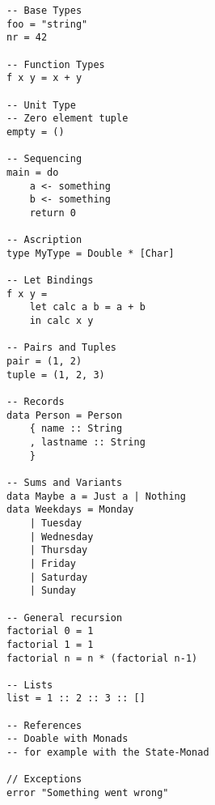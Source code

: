 \begin{verbatim}
-- Base Types
foo = "string"
nr = 42

-- Function Types
f x y = x + y

-- Unit Type
-- Zero element tuple
empty = ()

-- Sequencing
main = do
    a <- something
    b <- something
    return 0

-- Ascription
type MyType = Double * [Char]

-- Let Bindings
f x y =
    let calc a b = a + b
    in calc x y

-- Pairs and Tuples
pair = (1, 2)
tuple = (1, 2, 3)

-- Records
data Person = Person
    { name :: String
    , lastname :: String
    }

-- Sums and Variants
data Maybe a = Just a | Nothing
data Weekdays = Monday
    | Tuesday
    | Wednesday
    | Thursday
    | Friday
    | Saturday
    | Sunday

-- General recursion
factorial 0 = 1
factorial 1 = 1
factorial n = n * (factorial n-1)

-- Lists
list = 1 :: 2 :: 3 :: []

-- References
-- Doable with Monads
-- for example with the State-Monad

// Exceptions
error "Something went wrong"
\end{verbatim}
